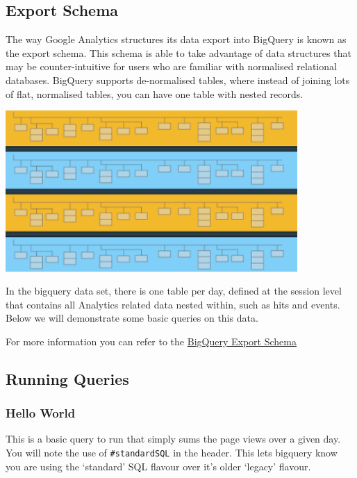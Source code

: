 \documentclass[]{book}
\begin{document}
\subsection{Export Schema}\label{export-schema}

The way Google Analytics structures its data export into BigQuery is
known as the export schema. This schema is able to take advantage of
data structures that may be counter-intuitive for users who are familiar
with normalised relational databases. BigQuery supports de-normalised
tables, where instead of joining lots of flat, normalised tables, you
can have one table with nested records.

\includegraphics[width=4.37in]{img/bqexport}

In the bigquery data set, there is one table per day, defined at the
session level that contains all Analytics related data nested within,
such as hits and events. Below we will demonstrate some basic queries on
this data.

For more information you can refer to the
\href{https://support.google.com/analytics/answer/3437719?hl=en\&ref_topic=3416089\#}{BigQuery
Export Schema}

\subsection{Running Queries}\label{running-queries}

\subsubsection{Hello World}\label{hello-world}

This is a basic query to run that simply sums the page views over a
given day. You will note the use of \texttt{\#standardSQL} in the
header. This lets bigquery know you are using the `standard' SQL flavour
over it's older `legacy' flavour.
\end{document}
